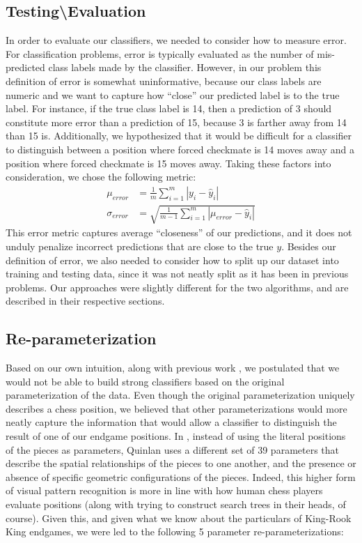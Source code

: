 \documentclass[fleqn]{article}
\begin{document}
\subsection{Testing\textbackslash Evaluation}
\label{subsec:Testing}
In order to evaluate our classifiers, we needed to consider how to measure error. For classification problems, error is typically evaluated as the number of mis-predicted class labels made by the classifier. However, in our problem this definition of error is somewhat uninformative, because our class labels are numeric and we want to capture how ``close'' our predicted label is to the true label. For instance, if the true class label is 14, then a prediction of 3 should constitute more error than a prediction of 15, because 3 is farther away from 14 than 15 is. Additionally, we hypothesized that it would be difficult for a classifier to distinguish between a position where forced checkmate is 14 moves away and a position where forced checkmate is 15 moves away. Taking these factors into consideration, we chose the following metric:
%
\begin{equation}
\label{eq:MeanError}
\begin{aligned}
	\mu_{error} &= \frac{1}{m} \sum_{i=1}^m |y_i - \hat{y}_i|\\
	\sigma_{error} &= \sqrt{\frac{1}{m-1} \sum_{i=1}^m |\mu_{error} - \hat{y}_i|} 
\end{aligned}
\end{equation}
%
This error metric captures average ``closeness'' of our predictions, and it does not unduly penalize incorrect predictions that are close to the true $y$. Besides our definition of error, we also needed to consider how to split up our dataset into training and testing data, since it was not neatly split as it has been in previous problems. Our approaches were slightly different for the two algorithms, and are described in their respective sections.

\subsection{Re-parameterization}
Based on our own intuition, along with previous work \cite{Quinlan:83}, we postulated that we would not be able to build strong classifiers based on the original parameterization of the data. Even though the original parameterization uniquely describes a chess position, we believed that other parameterizations would more neatly capture the information that would allow a classifier to distinguish the result of one of our endgame positions. In \cite{Quinlan:83}, instead of using the literal positions of the pieces as parameters, Quinlan uses a different set of 39 parameters that describe the spatial relationships of the pieces to one another, and the presence or absence of specific geometric configurations of the pieces. Indeed, this higher form of visual pattern recognition is more in line with how human chess players evaluate positions (along with trying to construct search trees in their heads, of course). Given this, and given what we know about the particulars of King-Rook King endgames, we were led to the following 5 parameter re-parameterizations:
\end{document}
